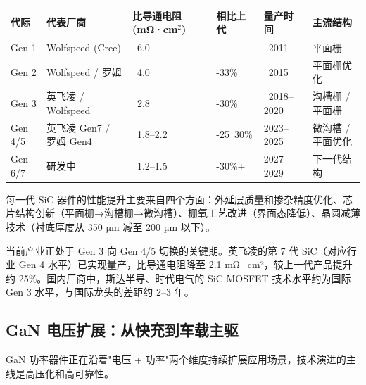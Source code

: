\begin{exhibitbox}
\centering
\small
\setlength{\tabcolsep}{4pt}
\begin{tabularx}{\textwidth}{C{1.2cm} L{2.2cm} C{2.5cm} C{2cm} C{2.2cm} C{2cm}}
\toprule
\textbf{代际} & \textbf{代表厂商} & \textbf{比导通电阻 (mΩ·cm$^2$)} & \textbf{相比上代} & \textbf{量产时间} & \textbf{主流结构} \\
\midrule
Gen 1 & Wolfspeed (Cree) & ~6.0 & — & ~2011 & 平面栅 \\
Gen 2 & Wolfspeed / 罗姆 & ~4.0 & -33\% & ~2015 & 平面栅优化 \\
Gen 3 & 英飞凌 / Wolfspeed & ~2.8 & -30\% & ~2018–2020 & 沟槽栅 / 平面栅 \\
Gen 4/5 & 英飞凌 Gen7 / 罗姆 Gen4 & ~1.8–2.2 & -25~30\% & 2023–2025 & 微沟槽 / 平面优化 \\
Gen 6/7 & 研发中 & ~1.2–1.5 & -30\%+ & 2027–2029 & 下一代结构 \\
\bottomrule
\end{tabularx}
\end{exhibitbox}

每一代 SiC 器件的性能提升主要来自四个方面：外延层质量和掺杂精度优化、芯片结构创新（平面栅→沟槽栅→微沟槽）、栅氧工艺改进（界面态降低）、晶圆减薄技术（衬底厚度从 350 µm 减至 200 µm 以下）。

当前产业正处于 Gen 3 向 Gen 4/5 切换的关键期。英飞凌的第 7 代 SiC（对应行业 Gen 4 水平）已实现量产，比导通电阻降至 2.1 mΩ·cm²，较上一代产品提升约 25\%。国内厂商中，斯达半导、时代电气的 SiC MOSFET 技术水平约为国际 Gen 3 水平，与国际龙头的差距约 2–3 年。

\subsection{GaN 电压扩展：从快充到车载主驱}

GaN 功率器件正在沿着"电压 + 功率"两个维度持续扩展应用场景，技术演进的主线是高压化和高可靠性。

